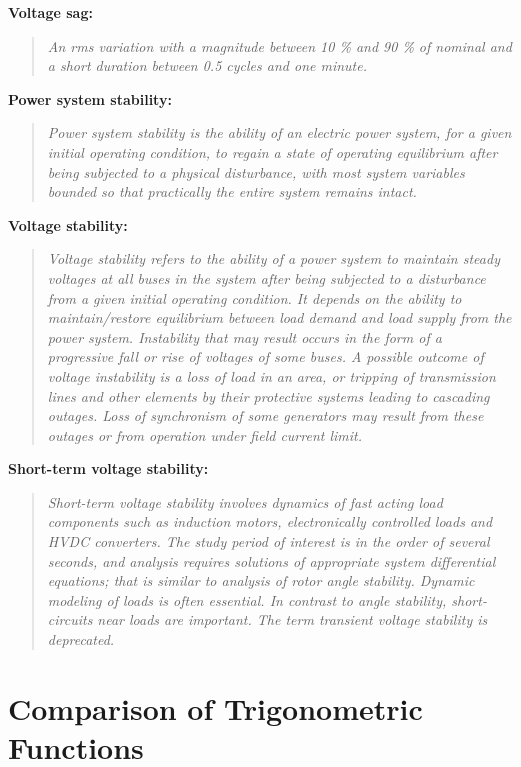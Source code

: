 \textbf{Voltage sag:}
\begin{quote}\itshape
    \glqq An rms variation with a magnitude between 10 \% and 90 \% of nominal and a short duration between 0.5 cycles and one minute.\grqq
\end{quote}

\textbf{Power system stability:}
\begin{quote}\itshape
    \glqq Power system stability is the ability of an electric power system, for a given initial operating condition, to regain a state of operating equilibrium after being subjected to a physical disturbance, with most system variables bounded so that practically the entire system remains intact.\grqq
\end{quote}

\textbf{Voltage stability:}
\begin{quote}\itshape
    \glqq Voltage stability refers to the ability of a power system to maintain steady voltages at all buses in the system after being subjected to a disturbance from a given initial operating condition. 
    It depends on the ability to maintain/restore equilibrium between load demand and load supply from the power system. 
    Instability that may result occurs in the form of a progressive fall or rise of voltages of some buses. 
    A possible outcome of voltage instability is a loss of load in an area, or tripping of transmission lines and other elements by their protective systems leading to cascading outages. 
    Loss of synchronism of some generators may result from these outages or from operation under field current limit.\grqq
\end{quote}

\textbf{Short-term voltage stability:}
\begin{quote}\itshape
    \glqq Short-term voltage stability involves dynamics of fast acting load components such as induction motors, electronically controlled loads and HVDC converters. 
    The study period of interest is in the order of several seconds, and analysis requires solutions of appropriate system differential equations; that is similar to analysis of rotor angle stability. 
    Dynamic modeling of loads is often essential. 
    In contrast to angle stability, short-circuits near loads are important. 
    The term transient voltage stability is deprecated.\grqq
\end{quote}

\section{Comparison of Trigonometric Functions}
\label{app:trogonometric-func-comp}

